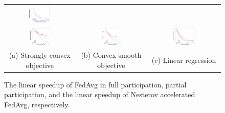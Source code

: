 \begin{figure}[ht!]
{\begin{tabular}{ccc}
\includegraphics[width=0.33\textwidth]{fig/paper-partiallinregressionspeedupNodesT-min-linearregressionw8a-epsilon002-reg0.pdf}\\
\hspace{-2em}\includegraphics[width=0.33\textwidth]{fig/paper-nesterovspeedupNodesT-min-w8a-epsilon0131-reg1e-05.pdf} & 
\includegraphics[width=0.33\textwidth]{fig/paper-nesterovspeedupNodesT-min-w8a-epsilon0134-reg0.pdf}
& 
\includegraphics[width=0.33\textwidth]{fig/paper-lrnesterovspeedupNodesT-min-linearregressionw8a-epsilon002-reg0.pdf}\\
(a) Strongly convex objective & (b) Convex smooth objective & (c) Linear regression
	\end{tabular}}
	\vspace{-1em}
\caption{The linear speedup of FedAvg in full participation, partial participation, and the linear speedup of Nesterov accelerated FedAvg, respectively.
}
\vspace{-1em}
\label{fig:speedup}
\end{figure}

